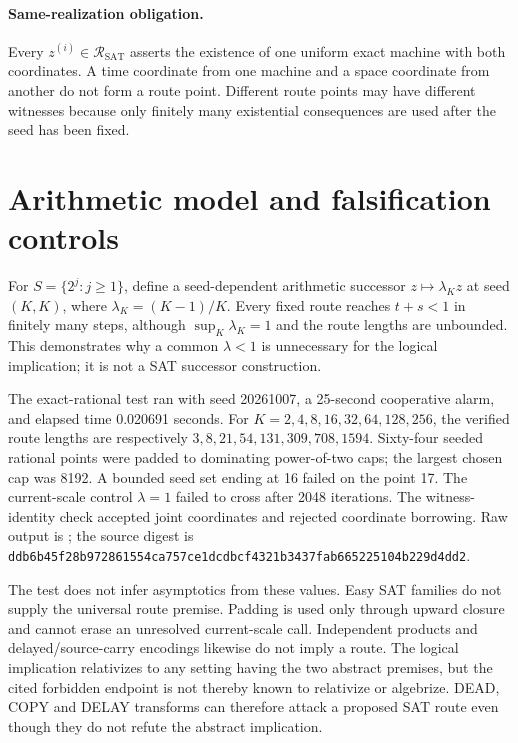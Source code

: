 \documentclass[11pt]{article}
\newcommand{\SAT}{\mathrm{SAT}}
\newcommand{\R}{\mathcal R_{\SAT}}
\begin{document}
\paragraph{Same-realization obligation.}
Every $z^{(i)}\in\R$ asserts the existence of one uniform exact machine with
both coordinates.  A time coordinate from one machine and a space coordinate
from another do not form a route point.  Different route points may have
different witnesses because only finitely many existential consequences are
used after the seed has been fixed.

\section*{Arithmetic model and falsification controls}
For $S=\{2^j:j\ge1\}$, define a seed-dependent arithmetic successor
$z\mapsto\lambda_Kz$ at seed $(K,K)$, where
$\lambda_K=(K-1)/K$.  Every fixed route reaches $t+s<1$ in finitely many
steps, although $\sup_K\lambda_K=1$ and the route lengths are unbounded.  This
demonstrates why a common $\lambda<1$ is unnecessary for the logical
implication; it is not a SAT successor construction.

The exact-rational test
 ran with seed
20261007, a 25-second cooperative alarm, and elapsed time 0.020691 seconds.
For $K=2,4,8,16,32,64,128,256$, the verified route lengths are respectively
$3,8,21,54,131,309,708,1594$.  Sixty-four seeded rational points were padded
to dominating power-of-two caps; the largest chosen cap was 8192.  A bounded
seed set ending at 16 failed on the point 17.  The current-scale control
$\lambda=1$ failed to cross after 2048 iterations.  The witness-identity check
accepted joint coordinates and rejected coordinate borrowing.  Raw output is
;
the source digest is
\texttt{ddb6b45f28b972861554ca757ce1dcdbcf4321b3437fab665225104b229d4dd2}.

The test does not infer asymptotics from these values.  Easy SAT families do
not supply the universal route premise.  Padding is used only through upward
closure and cannot erase an unresolved current-scale call.  Independent
products and delayed/source-carry encodings likewise do not imply a route.
The logical implication relativizes to any setting having the two abstract
premises, but the cited forbidden endpoint is not thereby known to relativize
or algebrize.  DEAD, COPY and DELAY transforms can therefore attack a proposed
SAT route even though they do not refute the abstract implication.
\end{document}
